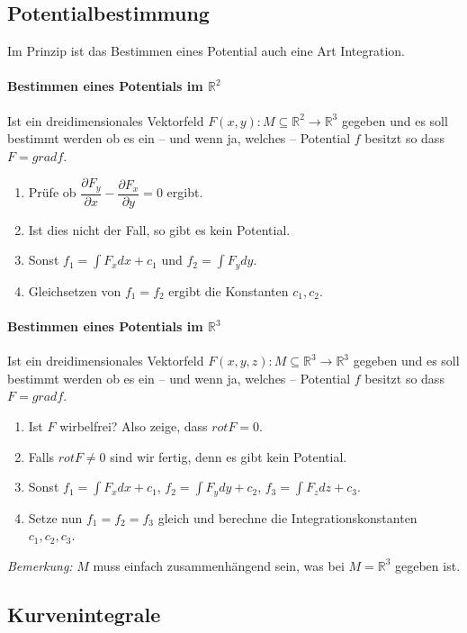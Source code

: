 \documentclass[a4paper, 9pt, DIV=24]{scrartcl}
\newcommand{\R}{\mathbb{R}}
\begin{document}
\subsection{Potentialbestimmung}
Im Prinzip ist das Bestimmen eines Potential auch eine Art Integration.

\paragraph{Bestimmen eines Potentials im $\R^2$}
Ist ein dreidimensionales Vektorfeld $F(x,y): M \subseteq \R^2 \rightarrow \R^3$ gegeben und es soll bestimmt werden ob
es ein -- und wenn ja, welches -- Potential $f$ besitzt so dass $F = grad f$.
\begin{enumerate}[label={(}\arabic*{)}]
 \item Prüfe ob $\dfrac{\partial F_y}{\partial x} - \dfrac{\partial F_x}{\partial y} = 0$ ergibt.
 \item Ist dies nicht der Fall, so gibt es kein Potential.
 \item Sonst $f_1 = \int F_xdx + c_1$ und $f_2 = \int F_ydy$.
 \item Gleichsetzen von $f_1 = f_2$ ergibt die Konstanten $c_1, c_2$.
\end{enumerate}

\paragraph{Bestimmen eines Potentials im $\R^3$}
Ist ein dreidimensionales Vektorfeld $F(x,y,z): M \subseteq \R^3 \rightarrow \R^3$ gegeben und es soll bestimmt werden ob
es ein -- und wenn ja, welches -- Potential $f$ besitzt so dass $F = grad f$.
\begin{enumerate}[label={(}\arabic*{)}]
 \item Ist $F$ wirbelfrei? Also zeige, dass $rot F = 0$.
 \item Falls $rot F \neq 0$ sind wir fertig, denn es gibt kein Potential.
 \item Sonst $f_1 = \int F_xdx + c_1$, $f_2 = \int F_ydy + c_2$, $f_3 = \int F_zdz + c_3$.
 \item Setze nun $f_1 = f_2 = f_3$ gleich und berechne die Integrationskonstanten $c_1, c_2, c_3$.
\end{enumerate}
\emph{Bemerkung:} $M$ muss einfach zusammenhängend sein, was bei $M = \R^3$ gegeben ist.

\subsection{Kurvenintegrale}
\end{document}
